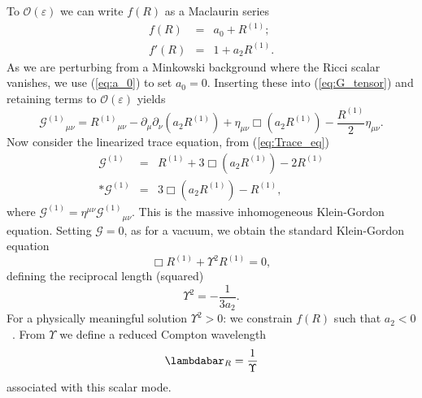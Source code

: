 \documentclass[aps,prd,amsfonts,amssymb,amsmath,nofootinbib,reprint,showpacs]{revtex4-1}
\newcommand{\eqnref}[1]{(\ref{eq:#1})}
\newcommand{\recip}[1]{\ensuremath{\frac{1}{#1}}}
\newcommand{\order}[1]{\ensuremath{\mathcal{O}({#1})}}
\begin{document}
To $\order{\varepsilon}$ we can write $f(R)$ as a Maclaurin series
\begin{eqnarray}
f(R) & = & a_0 + R^{(1)}; \\
f'(R) & = & 1 + a_2 R^{(1)}.
\end{eqnarray}
As we are perturbing from a Minkowski background where the Ricci scalar vanishes, we use \eqnref{a_0} to set $a_0 = 0$. Inserting these into \eqnref{G_tensor} and retaining terms to $\order{\varepsilon}$ yields
\begin{equation}
{\mathcal{G}^{(1)}}_{\mu\nu} = {R^{(1)}}_{\mu\nu} - \partial_\mu\partial_\nu(a_2 R^{(1)}) + \eta_{\mu\nu}\Box(a_2 R^{(1)}) - \frac{R^{(1)}}{2}\eta_{\mu\nu}.
\label{eq:Field}
\end{equation}
Now consider the linearized trace equation, from \eqnref{Trace_eq}
\begin{eqnarray}
\mathcal{G}^{(1)} & = & R^{(1)} + 3 \Box(a_2 R^{(1)}) - 2 R^{(1)} \nonumber \\*
\mathcal{G}^{(1)} & = & 3 \Box(a_2 R^{(1)}) - R^{(1)},
\label{eq:Box_R}
\end{eqnarray}
where $\mathcal{G}^{(1)} = \eta^{\mu\nu}{\mathcal{G}^{(1)}}_{\mu\nu}$. This is the massive inhomogeneous Klein-Gordon equation. Setting $\mathcal{G} = 0$, as for a vacuum, we obtain the standard Klein-Gordon equation
\begin{equation}
\Box R^{(1)} + \Upsilon^2 R^{(1)} = 0,
\end{equation}
defining the reciprocal length (squared)
\begin{equation}
\Upsilon^2 = -\recip{3a_2}.
\end{equation}
For a physically meaningful solution $\Upsilon^2 > 0$: we constrain $f(R)$ such that $a_2 < 0$~\cite{Schmidt1986, Teyssandier1990, Olmo2005c, Corda2007}. From $\Upsilon$ we define a reduced Compton wavelength
\begin{equation}
\lambdabar_R = \recip{\Upsilon}
\end{equation}
associated with this scalar mode.
\end{document}

